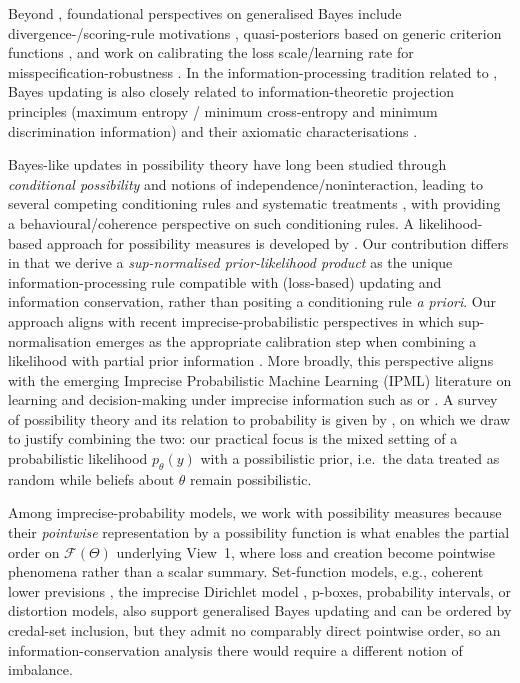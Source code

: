 \documentclass[accepted]{uai2026} %
\theoremstyle{remark}
\begin{document}
Beyond \citet{bissiri2016general}, foundational perspectives on generalised Bayes include divergence-/scoring-rule motivations \citep{jewson2018principles, knoblauch2022optimization}, quasi-posteriors based on generic criterion functions \citep{chernozhukov2003mcmc}, and work on calibrating the loss scale/learning rate for misspecification-robustness \citep{grunwald2017inconsistency,syring2019calibrating,lyddon2019general}.
In the information-processing tradition related to \citet{zellner1988optimal}, Bayes updating is also closely related to information-theoretic projection principles (maximum entropy / minimum cross-entropy and minimum discrimination information) and their axiomatic characterisations \citep{jaynes1957information, shore1980axiomatic, csiszar1975divergence}.

Bayes-like updates in possibility theory have long been studied through \emph{conditional possibility} and notions of independence/noninteraction, leading to several competing conditioning rules and systematic treatments \citep{hisdal1978conditional, decooman1997conditional}, with \citet{walley1999coherence} providing a behavioural/coherence perspective on such conditioning rules. A likelihood-based approach for possibility measures is developed by \citet{dubois1997semantics}. Our contribution differs in that we derive a \emph{sup-normalised prior-likelihood product} as the unique information-processing rule compatible with (loss-based) updating and information conservation, rather than positing a conditioning rule \emph{a priori}. Our approach aligns with recent imprecise-probabilistic perspectives in which sup-normalisation emerges as the appropriate calibration step when combining a likelihood with partial prior information \citep{martin2026possibilistic}. More broadly, this perspective aligns with the emerging Imprecise Probabilistic Machine Learning (IPML) literature on learning and decision-making under imprecise information such as \citet{caprio2024credal,singh2024domain} or \citet{chau2025integral}. A survey of possibility theory and its relation to probability is given by \citet[Ch.~5]{dubois2015possibility}, on which we draw to justify combining the two: our practical focus is the mixed setting of a probabilistic likelihood $p_\theta(y)$ with a possibilistic prior, i.e.\ the data treated as random while beliefs about $\theta$ remain possibilistic.

Among imprecise-probability models, we work with possibility measures because their \emph{pointwise} representation by a possibility function is what enables the partial order on $\mathcal{F}(\Theta)$ underlying View~1, where loss and creation become pointwise phenomena rather than a scalar summary. Set-function models, e.g., coherent lower previsions \citep{walley1991statistical}, the imprecise Dirichlet model \citep{bernard2005introduction}, p-boxes, probability intervals, or distortion models, also support generalised Bayes updating and can be ordered by credal-set inclusion, but they admit no comparably direct pointwise order, so an information-conservation analysis there would require a different notion of imbalance.
\end{document}
